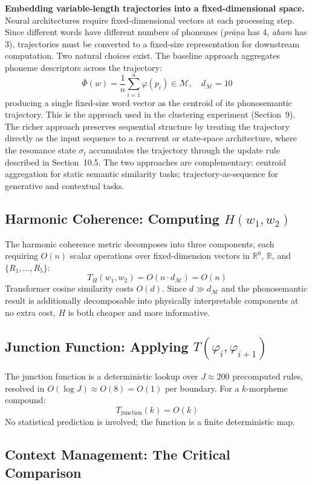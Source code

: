 \documentclass[12pt]{article}
\begin{document}
\textbf{Embedding variable-length trajectories into a fixed-dimensional space.}
Neural architectures require fixed-dimensional vectors at each processing step. Since different words have different numbers of phonemes (\textit{prāṇa} has 4, \textit{aham} has 3), trajectories must be converted to a fixed-size representation for downstream computation. Two natural choices exist. The baseline approach aggregates phoneme descriptors across the trajectory:
\[
\bar{\Phi}(w) = \frac{1}{n}\sum_{i=1}^n \varphi(p_i) \in \mathcal{M}, \quad d_\mathcal{M} = 10
\]
producing a single fixed-size word vector as the centroid of its phonosemantic trajectory. This is the approach used in the clustering experiment (Section~9). The richer approach preserves sequential structure by treating the trajectory directly as the input sequence to a recurrent or state-space architecture, where the resonance state $\sigma_t$ accumulates the trajectory through the update rule described in Section~10.5. The two approaches are complementary: centroid aggregation for static semantic similarity tasks; trajectory-as-sequence for generative and contextual tasks.

\subsection{Harmonic Coherence: Computing $H(w_1, w_2)$}

The harmonic coherence metric decomposes into three components, each requiring $O(n)$ scalar operations over fixed-dimension vectors in $\mathbb{R}^6$, $\mathbb{R}$, and $\{R_1,\ldots,R_5\}$:
\[
T_H(w_1, w_2) = O(n \cdot d_\mathcal{M}) = O(n)
\]
Transformer cosine similarity costs $O(d)$. Since $d \gg d_\mathcal{M}$ and the phonosemantic result is additionally decomposable into physically interpretable components at no extra cost, $H$ is both cheaper and more informative.

\subsection{Junction Function: Applying $T(\varphi_i, \varphi_{i+1})$}

The junction function is a deterministic lookup over $J \approx 200$ precomputed rules, resolved in $O(\log J) \approx O(8) = O(1)$ per boundary. For a $k$-morpheme compound:
\[
T_\text{junction}(k) = O(k)
\]
No statistical prediction is involved; the function is a finite deterministic map.

\subsection{Context Management: The Critical Comparison}
\end{document}
